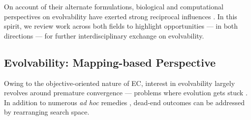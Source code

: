 On account of their alternate formulations, biological and computational perspectives on evolvability have exerted strong reciprocal influences \citep{kirschner2017plausibility,dawkins1989evolution,nuodelarosa2017computing,wagner1996perspective}.
In this spirit, we review work across both fields to highlight opportunities --- in both directions --- for further interdisciplinary exchange on evolvability.

\subsection{Evolvability: Mapping-based Perspective}

Owing to the objective-oriented nature of EC, interest in evolvability largely revolves around premature convergence --- problems where evolution gets stuck \citep{crepinsek2013exploration,andre2001improvement,bongard2010guarding,pandey2014comparative,squillero2016divergence}.
In addition to numerous \textit{ad hoc} remedies \citep{ragusa2022augmenting,wang2018population,dang2016selfadaptation,fogel1994introduction,fouskakis2002stochastic,kirkpatrick1983optimization,de2015money,doerr2014impact}, dead-end outcomes can be addressed by rearranging search space.

